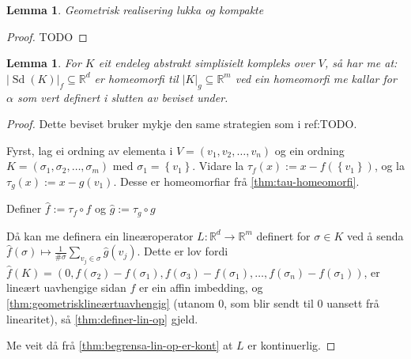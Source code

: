 \documentclass[a4paper, titlepage, 12pt, norsk]{article}
\theoremstyle{plain}
\newtheorem{lemma}[theorem]{Lemma}
\theoremstyle{definition}
\newcommand{\Rb}{\mathbb{R}}
\newcommand{\gr}[1]{ \lvert #1 \rvert } %
\newcommand{\set}[1]{ \left \{ #1 \right \} } %
\DeclareMathOperator{\Sd}{Sd}
\begin{document}
\begin{lemma} \label{thm:geometrisk-kompleks-lukka}
	Geometrisk realisering lukka og kompakte
\end{lemma}

\begin{proof}
	TODO
\end{proof}

\begin{lemma} \label{thm:alpha-homeomorfi}
	For \( K \) eit endeleg abstrakt simplisielt kompleks over \( V \), så har me at:
	\( \gr{\Sd(K)}_f \subseteq \Rb^d \) er homeomorfi til \( \gr{K}_g \subseteq \Rb^m \) ved ein homeomorfi me kallar for \( \alpha \) som vert definert i slutten av beviset under.
\end{lemma}

\begin{proof} %
	Dette beviset bruker mykje den same strategien som i ref:TODO.

	Fyrst, lag ei ordning av elementa i \( V = (v_1, v_2, \dots, v_n) \) og ein ordning \( K = (\sigma_1, \sigma_2, \dots, \sigma_m) \) med \( \sigma_1 = \set{v_1} \). Vidare la \( \tau_f(x) := x-f(\set{v_1}) \), og la \( \tau_g(x) := x-g(v_1) \). Desse er homeomorfiar frå \autoref{thm:tau-homeomorfi}.

	Definer \( \hat{f} := \tau_f \circ f \) og \( \hat{g} := \tau_g \circ g \)

	Då kan me definera ein lineæroperator \( L: \Rb^d \to \Rb^m \) definert for \( \sigma \in K \) ved å senda \( \hat{f}(\sigma) \mapsto \frac{1}{\#\sigma}\sum_{v_j \in \sigma} \hat{g}(v_j) \). Dette er lov fordi \( \hat{f}(K) = (0, f(\sigma_2)-f(\sigma_1), f(\sigma_3)-f(\sigma_1), \dots, f(\sigma_n)-f(\sigma_1) ) \), er lineært uavhengige sidan \( f \) er ein affin imbedding, og \autoref{thm:geometrisklineærtuavhengig} (utanom \( 0 \), som blir sendt til \( 0 \) uansett frå linearitet), så \autoref{thm:definer-lin-op} gjeld.

	Me veit då frå \autoref{thm:begrensa-lin-op-er-kont} at \( L \) er kontinuerlig. 


\end{proof}
\end{document}
